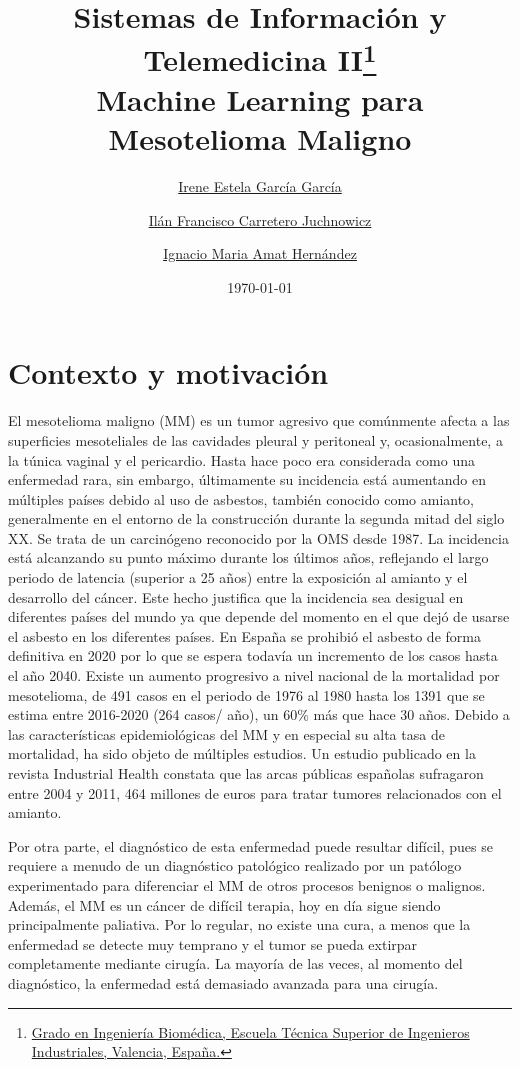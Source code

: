 \documentclass{article}
\title{Sistemas de Información y Telemedicina II\thanks{\href{https://www.upv.es/titulaciones/GIB/indexc.html}{Grado en Ingeniería Biomédica, Escuela Técnica Superior de Ingenieros Industriales, Valencia, España.}} \\\textbf{Machine Learning para Mesotelioma Maligno}}
\author{
\href{mailto:irgarga4@etsii.upv.es}{Irene Estela García García}
\and
\href{mailto:ilcarjuc@etsii.upv.es}{Ilán Francisco Carretero Juchnowicz}
\and
\href{mailto:igamher@etsid.upv.es}{Ignacio Maria Amat Hernández}
}
\date{\today}
\begin{document}
\maketitle
\newpage
\tableofcontents
\listoffigures
\lstlistoflistings
\newpage

\section{Contexto y motivación}


El mesotelioma maligno (MM) es un tumor agresivo que comúnmente afecta
a las superficies mesoteliales de las cavidades pleural  y  peritoneal
y, ocasionalmente, a la túnica vaginal y el  pericardio.   Hasta  hace
poco  era  considerada	como  una  enfermedad	rara,	sin   embargo,
últimamente su incidencia está aumentando en múltiples	países	debido
al uso de asbestos, también conocido como amianto, generalmente en  el
entorno de la construcción durante la segunda mitad del siglo XX.   Se
trata de  un  carcinógeno  reconocido  por  la	OMS  desde  1987.   La
incidencia está alcanzando su punto máximo durante los	últimos  años,
reflejando el largo periodo de latencia (superior a 25 años) entre  la
exposición al amianto y el desarrollo del cáncer. Este hecho justifica
que la incidencia sea desigual en diferentes países del mundo  ya  que
depende del momento en el  que	dejó  de  usarse  el  asbesto  en  los
diferentes  países.   En  España  se  prohibió	el  asbesto  de  forma
definitiva en 2020 por lo que se espera todavía un incremento  de  los
casos hasta el año 2040. Existe un aumento progresivo a nivel nacional
de la mortalidad por mesotelioma, de 491 casos en el periodo  de  1976
al 1980 hasta los 1391 que se estima entre 2016-2020 (264 casos/ año),
un  60\%  más  que  hace  30  años.   Debido  a  las   características
epidemiológicas del MM y en especial su alta tasa  de  mortalidad,  ha
sido objeto de múltiples estudios.  Un estudio publicado en la revista
Industrial Health constata que las arcas públicas españolas sufragaron
entre  2004  y	2011,  464  millones  de  euros  para  tratar  tumores
relacionados con el amianto.

Por otra parte, el  diagnóstico  de  esta  enfermedad  puede  resultar
difícil, pues se  requiere  a  menudo  de  un  diagnóstico  patológico
realizado por un patólogo experimentado  para  diferenciar  el	MM  de
otros procesos benignos o malignos.  Además, el MM  es	un  cáncer  de
difícil terapia, hoy en día sigue siendo principalmente paliativa. Por
lo regular, no existe una cura, a menos que la enfermedad  se  detecte
muy temprano y el  tumor  se  pueda  extirpar  completamente  mediante
cirugía.  La mayoría de las veces,  al	momento  del  diagnóstico,  la
enfermedad    está    demasiado    avanzada    para    una    cirugía.
\end{document}
